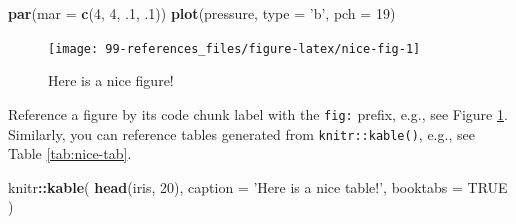 \documentclass[]{book}
\newenvironment{Shaded}{\begin{snugshade}}{\end{snugshade}}
\newcommand{\KeywordTok}[1]{\textcolor[rgb]{0.13,0.29,0.53}{\textbf{#1}}}
\newcommand{\DataTypeTok}[1]{\textcolor[rgb]{0.13,0.29,0.53}{#1}}
\newcommand{\DecValTok}[1]{\textcolor[rgb]{0.00,0.00,0.81}{#1}}
\newcommand{\StringTok}[1]{\textcolor[rgb]{0.31,0.60,0.02}{#1}}
\newcommand{\OtherTok}[1]{\textcolor[rgb]{0.56,0.35,0.01}{#1}}
\newcommand{\OperatorTok}[1]{\textcolor[rgb]{0.81,0.36,0.00}{\textbf{#1}}}
\newcommand{\NormalTok}[1]{#1}
\begin{document}
\begin{Shaded}
\begin{Highlighting}[]
\KeywordTok{par}\NormalTok{(}\DataTypeTok{mar =} \KeywordTok{c}\NormalTok{(}\DecValTok{4}\NormalTok{, }\DecValTok{4}\NormalTok{, .}\DecValTok{1}\NormalTok{, .}\DecValTok{1}\NormalTok{))}
\KeywordTok{plot}\NormalTok{(pressure, }\DataTypeTok{type =} \StringTok{'b'}\NormalTok{, }\DataTypeTok{pch =} \DecValTok{19}\NormalTok{)}
\end{Highlighting}
\end{Shaded}

\begin{figure}

{\centering \texttt{[image: 99-references\_files/figure-latex/nice-fig-1]} 

}

\caption{Here is a nice figure!}\label{fig:nice-fig}
\end{figure}

Reference a figure by its code chunk label with the \texttt{fig:}
prefix, e.g., see Figure \ref{fig:nice-fig}. Similarly, you can
reference tables generated from \texttt{knitr::kable()}, e.g., see Table
\ref{tab:nice-tab}.

\begin{Shaded}
\begin{Highlighting}[]
\NormalTok{knitr}\OperatorTok{::}\KeywordTok{kable}\NormalTok{(}
  \KeywordTok{head}\NormalTok{(iris, }\DecValTok{20}\NormalTok{), }\DataTypeTok{caption =} \StringTok{'Here is a nice table!'}\NormalTok{,}
  \DataTypeTok{booktabs =} \OtherTok{TRUE}
\NormalTok{)}
\end{Highlighting}
\end{Shaded}
\end{document}
